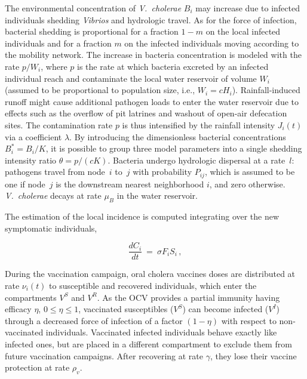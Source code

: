 The environmental concentration of \textit{V.~cholerae} $B_i$ may increase due to  infected individuals shedding \textit{Vibrios} and hydrologic travel. As for the force of infection, bacterial shedding is proportional for a fraction $1-m$ on the local infected individuals and for a fraction $m$ on the infected individuals moving according to the mobility network. The increase in bacteria concentration is modeled with the rate $p/W_i$, where $p$ is the rate at which bacteria excreted by an infected individual reach and contaminate the local water reservoir of volume $W_i$ (assumed to be proportional to population size, i.e., $W_i=c H_i$\cite{Rinaldo:Reassessment20102011:2012}). Rainfall-induced runoff might cause additional pathogen loads to enter the water reservoir due to effects such as the overflow of pit latrines and washout of open-air defecation sites. The contamination rate $p$ is thus intensified by the rainfall intensity $J_i(t)$ via a coefficient $\lambda$\cite{Rinaldo:Reassessment20102011:2012,Righetto:RainfallMediationsSpreading:2013}. By introducing the dimensionless bacterial concentrations $B_i^*=B_i/K$,  it is possible to group three model parameters into a single shedding intensity ratio $\theta=p/(cK)$\cite{Bertuzzo:SpacetimeEvolutionCholera:2008}. Bacteria undergo hydrologic dispersal at a rate~$l$: pathogens travel from node~$i$ to~$j$ with probability $P_{ij}$, which is assumed to be one if node~$j$ is the downstream nearest neighborhood $i$, and zero otherwise. \textit{V.~cholerae} decays at rate $\mu_B$ in the water reservoir.

The estimation of the local incidence is computed integrating over the new symptomatic individuals,

\begin{equation}
\frac{d C_i}{dt} \ = \ \sigma F_i S_i  \, , \label{eq:C}
\end{equation}

During the vaccination campaign, oral cholera vaccines doses are distributed at rate $\nu_i(t)$ to susceptible and recovered individuals, which enter the compartments $V^S$ and $V^R$. As the OCV provides a partial immunity having efficacy $\eta$, $0\leq \eta \leq 1$, vaccinated susceptibles ($V^S$) can become infected ($V^I$) through a decreased force of infection of a factor $(1-\eta)$ with respect to non-vaccinated individuals. Vaccinated infected individuals behave exactly like infected ones, but are placed in a different compartment to exclude them from future vaccination campaigns. After recovering at rate $\gamma$, they lose their vaccine protection at rate $\rho_{v}$.


